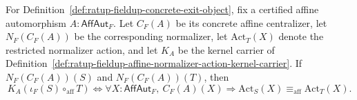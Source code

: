 \begin{theorem}
\label{thm:ratup-fieldup-restricted-normalizer-action-kernel-fiber-exactness}
For Definition~\ref{def:ratup-fieldup-concrete-exit-object}, fix a certified
affine automorphism $A:\mathsf{AffAut}_F$. Let $C_F(A)$ be its concrete affine
centralizer, let $N_F(C_F(A))$ be the corresponding normalizer, let
$\mathrm{Act}_T(X)$ denote the restricted normalizer action, and let $K_A$ be
the kernel carrier of
Definition~\ref{def:ratup-fieldup-affine-normalizer-action-kernel-carrier}. If
$N_F(C_F(A))(S)$ and $N_F(C_F(A))(T)$, then
$$
K_A(\iota_F(S)\circ_{\mathrm{aff}}T)
\Longleftrightarrow
\forall X:\mathsf{AffAut}_F,\ C_F(A)(X)\Rightarrow
\mathrm{Act}_S(X)\equiv_{\mathrm{aff}}\mathrm{Act}_T(X).
$$
\end{theorem}
